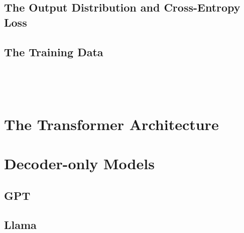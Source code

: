 





\subsection{The Output Distribution and Cross-Entropy Loss}\label{subsec:the-output-distribution---cross-entropy-loss}

\subsection{The Training Data}\label{subsec:the-training-data}

~\autocite{transformer2022}

~\autocite{transformer2024}


\section{The Transformer Architecture}\label{sec:the-transformer-architecture}









\section{Decoder-only Models}\label{sec:decoder}

\subsection{GPT}\label{subsec:gpt}

\subsection{Llama}\label{subsec:llama}

